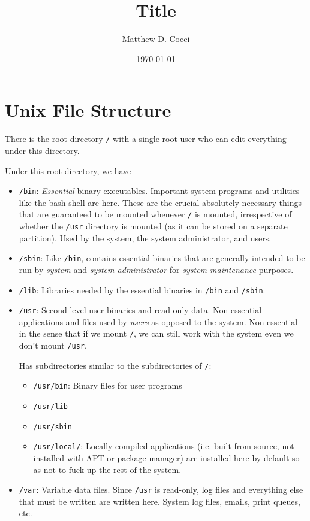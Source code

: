 \documentclass[12pt]{article}
\author{Matthew D. Cocci}
\title{Title}
\date{\today}
\theoremstyle{plain}
\theoremstyle{definition}
\theoremstyle{remark}
\begin{document}
\lstset{style=log}


\section{Unix File Structure}

There is the root directory \texttt{/} with a single root user who can
edit everything under this directory.

Under this root directory, we have
\begin{itemize}
  \item \texttt{/bin}: \emph{Essential} binary executables.
    Important system programs and utilities like the bash shell are
    here.
    These are the crucial absolutely necessary things that are
    guaranteed to be mounted whenever \texttt{/} is mounted,
    irrespective of whether the \texttt{/usr} directory is mounted (as
    it can be stored on a separate partition).
    Used by the system, the system administrator, and users.

  \item \texttt{/sbin}: Like \texttt{/bin}, contains essential binaries
    that are generally intended to be run by \emph{system} and
    \emph{system administrator} for \emph{system maintenance} purposes.

  \item \texttt{/lib}:
    Libraries needed by the essential binaries in \texttt{/bin} and
    \texttt{/sbin}.

  \item \texttt{/usr}:
    Second level user binaries and read-only data.
    Non-essential applications and files used by \emph{users} as opposed
    to the system. Non-essential in the sense that if we mount
    \texttt{/}, we can still work with the system even we don't mount
    \texttt{/usr}.


    Has subdirectories similar to the subdirectories of \texttt{/}:
    \begin{itemize}
      \item \texttt{/usr/bin}:
        Binary files for user programs
      \item \texttt{/usr/lib}
      \item \texttt{/usr/sbin}
      \item \texttt{/usr/local/}:
        Locally compiled applications (i.e. built from source, not
        installed with APT or package manager) are installed here by
        default so as not to fuck up the rest of the system.
    \end{itemize}
  \item \texttt{/var}:
    Variable data files.
    Since \texttt{/usr} is read-only, log files and everything else that
    must be written are written here.
    System log files, emails, print queues, etc.



\end{itemize}
\end{document}
